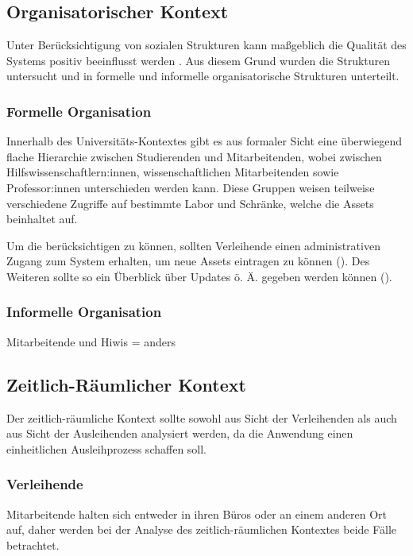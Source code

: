 \subsection{Organisatorischer Kontext}
Unter Berücksichtigung von sozialen Strukturen kann maßgeblich die Qualität des Systems positiv
beeinflusst werden \cite{herczeg_einfuhrung_2009}. Aus diesem Grund wurden die Strukturen untersucht
und in formelle und informelle organisatorische Strukturen unterteilt.

\subsubsection{Formelle Organisation}
Innerhalb des Universitäts-Kontextes gibt es aus formaler Sicht eine überwiegend flache Hierarchie
zwischen Studierenden und Mitarbeitenden, wobei zwischen Hilfswissenschaftlern:innen,
wissenschaftlichen Mitarbeitenden sowie Professor:innen unterschieden werden kann. Diese Gruppen
weisen teilweise verschiedene Zugriffe auf bestimmte Labor und Schränke, welche die Assets
beinhaltet auf.

Um die  berücksichtigen zu können, sollten Verleihende einen administrativen
Zugang zum System erhalten, um neue Assets eintragen zu können ().
Des Weiteren sollte so ein Überblick über Updates ö. Ä. gegeben werden können
(). 

\subsubsection{Informelle Organisation}
Mitarbeitende und Hiwis = anders

\subsection{Zeitlich-Räumlicher Kontext}
\label{section:zeit}
Der zeitlich-räumliche Kontext sollte sowohl aus Sicht der Verleihenden als auch aus Sicht der
Ausleihenden analysiert werden, da die Anwendung einen einheitlichen Ausleihprozess schaffen soll. 

\subsubsection{Verleihende}
Mitarbeitende halten sich entweder in ihren Büros oder an einem anderen Ort auf, daher werden bei
der Analyse des zeitlich-räumlichen Kontextes beide Fälle betrachtet.

